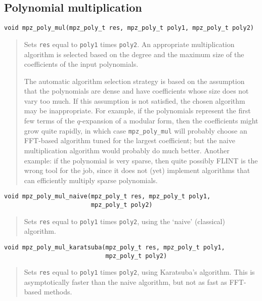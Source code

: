 \documentclass[a4paper,10pt]{article}
\newcommand{\code}{\lstinline}
\begin{document}
\subsection{Polynomial multiplication}

\begin{lstlisting}
void mpz_poly_mul(mpz_poly_t res, mpz_poly_t poly1, mpz_poly_t poly2)
\end{lstlisting}
\begin{quote}
Sets \code{res} equal to \code{poly1} times \code{poly2}. An appropriate multiplication algorithm is selected based on the degree and the maximum size of the coefficients of the input polynomials.

The automatic algorithm selection strategy is based on the assumption that the polynomials are dense and have coefficients whose size does not vary too much. If this assumption is not satisfied, the chosen algorithm may be inappropriate. For example, if the polynomials represent the first few terms of the $q$-expansion of a modular form, then the coefficients might grow quite rapidly, in which case \code{mpz_poly_mul} will probably choose an FFT-based algorithm tuned for the largest coefficient; but the naive multiplication algorithm would probably do much better. Another example: if the polynomial is very sparse, then quite possibly FLINT is the wrong tool for the job, since it does not (yet) implement algorithms that can efficiently multiply sparse polynomials.
\end{quote}


\begin{lstlisting}
void mpz_poly_mul_naive(mpz_poly_t res, mpz_poly_t poly1,
                        mpz_poly_t poly2)
\end{lstlisting}
\begin{quote}
Sets \code{res} equal to \code{poly1} times \code{poly2}, using the `naive' (classical) algorithm.
\end{quote}

\begin{lstlisting}
void mpz_poly_mul_karatsuba(mpz_poly_t res, mpz_poly_t poly1,
                            mpz_poly_t poly2)
\end{lstlisting}
\begin{quote}
Sets \code{res} equal to \code{poly1} times \code{poly2}, using Karatsuba's algorithm. This is asymptotically faster than the naive algorithm, but not as fast as FFT-based methods.
\end{quote}
\end{document}
